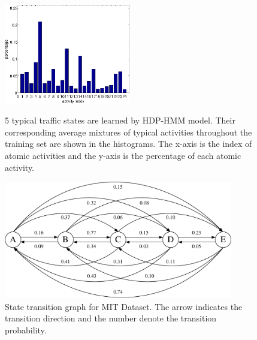 \begin{figure}[!htp]
{\begin{minipage}{0.45\linewidth}
		\end{minipage}
		\hspace{1.2cm}
		\begin{minipage}{0.45\linewidth}
			\centering\includegraphics[width = 5.5cm]{figures/MIT/s5_hist-crop.pdf}
		\end{minipage}
		\label{fig:mit_state5}
	}			
	\caption[Typical traffic states in MIT Dataset]
	{5 typical traffic states are learned by HDP-HMM model. Their corresponding average mixtures of typical activities throughout the training set are shown in the histograms. The x-axis is the index of atomic activities and the y-axis is the percentage of each atomic activity.}
	\label{mit_state}
\end{figure}

\begin{figure}
	\centering
	\includegraphics[width=10cm]{figures/MIT/transition-crop.pdf}
	\caption[State transition graph MIT Dataset]{State transition graph for MIT Dataset. The arrow indicates the transition direction and the number denote the transition probability.}
	\label{fig:mit_transition}
\end{figure}

